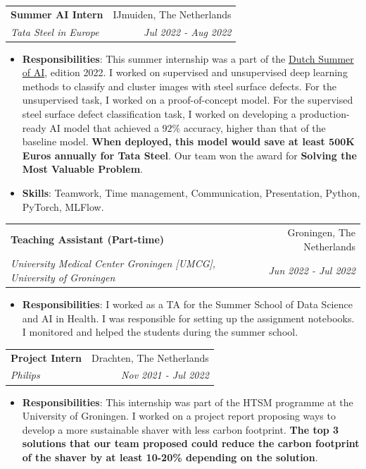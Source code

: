 \documentclass[letterpaper, 11pt]{article}
\makeatletter
\newcommand{\resumeItem}[2]{
    \item\small{
        \textbf{#1}{: #2 \vspace{-2pt}}
    }
}
\newcommand{\resumeSubheading}[4]{
    \vspace{-1pt}\item
    \begin{tabular*}{0.97\textwidth}{l@{\extracolsep{\fill}}r}
        \textbf{#1} & #2 \\
        \textit{\small#3} & \textit{\small #4} \\
    \end{tabular*}\vspace{-5pt}
}
\newcommand{\resumeSubHeadingListStart}{\begin{itemize}[leftmargin=*]}
\newcommand{\resumeSubHeadingListEnd}{\end{itemize}\vspace{-5pt}}
\makeatother
\begin{document}
        \resumeSubheading{Summer AI Intern}{IJmuiden, The Netherlands}{Tata Steel in Europe}{Jul 2022 - Aug 2022}
            \resumeSubHeadingListStart
                \resumeItem{Responsibilities}{This summer internship was a part of the \href{https://www.summerof.ai/}{Dutch Summer of AI}, edition 2022. I worked on supervised and unsupervised deep learning methods to classify and cluster images with steel surface defects. For the unsupervised task, I worked on a proof-of-concept model. For the supervised steel surface defect classification task, I worked on developing a production-ready AI model that achieved a $92\%$ accuracy, higher than that of the baseline model. \textbf{When deployed, this model would save at least $\mathbf{500}$K Euros annually for Tata Steel}. Our team won the award for \textbf{Solving the Most Valuable Problem}.}
                \resumeItem{Skills}{Teamwork, Time management, Communication, Presentation, Python, PyTorch, MLFlow.}
            \resumeSubHeadingListEnd

        \resumeSubheading{Teaching Assistant (Part-time)}{Groningen, The Netherlands}{University Medical Center Groningen [UMCG], University of Groningen}{Jun 2022 - Jul 2022}
            \resumeSubHeadingListStart
                \resumeItem{Responsibilities}{I worked as a TA for the Summer School of Data Science and AI in Health. I was responsible for setting up the assignment notebooks. I monitored and helped the students during the summer school.}
            \resumeSubHeadingListEnd

        \resumeSubheading{Project Intern}{Drachten, The Netherlands}{Philips}{Nov 2021 - Jul 2022}
            \resumeSubHeadingListStart
                \resumeItem{Responsibilities}{This internship was part of the HTSM programme at the University of Groningen. I worked on a project report proposing ways to develop a more sustainable shaver with less carbon footprint. \textbf{The top 3 solutions that our team proposed could reduce the carbon footprint of the shaver by at least 10-20\% depending on the solution}.}
            \resumeSubHeadingListEnd
\end{document}
